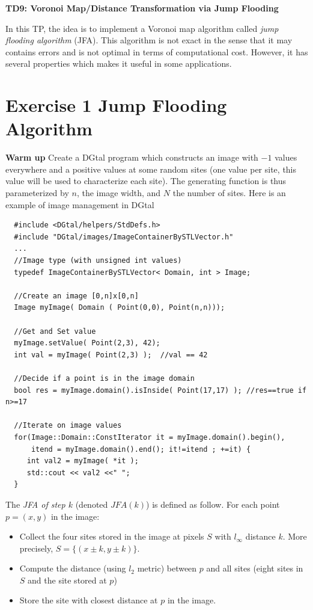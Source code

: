 \documentclass[a4paper, 11pt]{article}
\title{}
\author{}
\date{}
\begin{document}
\begin{center}
	\LARGE \textbf{TD9: Voronoi Map/Distance Transformation via Jump Flooding}
\end{center}

\bigskip
\par In this TP, the idea is to implement a Voronoi map algorithm called \emph{jump flooding algorithm} (JFA). This algorithm is not exact in the sense that it may contains errors and is not optimal in terms of computational cost. However, it has several properties which makes it useful in some applications.



\section*{Exercise 1 \rm Jump Flooding Algorithm}

{\bf Warm up} Create a DGtal program which constructs an image with $-1$  values everywhere and a positive  values at some random sites (one value per site, this value will be used to characterize each site). The generating function is thus parameterized by $n$, the image width, and $N$ the number of sites. Here is an example of image management in DGtal
\begin{verbatim}
  #include <DGtal/helpers/StdDefs.h>
  #include "DGtal/images/ImageContainerBySTLVector.h"
  ...
  //Image type (with unsigned int values)
  typedef ImageContainerBySTLVector< Domain, int > Image;

  //Create an image [0,n]x[0,n]
  Image myImage( Domain ( Point(0,0), Point(n,n)));

  //Get and Set value
  myImage.setValue( Point(2,3), 42);
  int val = myImage( Point(2,3) );  //val == 42

  //Decide if a point is in the image domain
  bool res = myImage.domain().isInside( Point(17,17) ); //res==true if n>=17

  //Iterate on image values
  for(Image::Domain::ConstIterator it = myImage.domain().begin(),
      itend = myImage.domain().end(); it!=itend ; +=it) {
     int val2 = myImage( *it );
     std::cout << val2 <<" ";
  }
\end{verbatim}


\par The \emph{JFA of step $k$} (denoted $JFA(k)$) is defined as follow. For each point $p=(x,y)$ in the image:
	\begin{itemize}
	\item Collect the four sites stored in the image at pixels $S$
          with  $l_\infty$  distance $k$. More precisely, $S=\{ (x \pm k,y\pm k)\}$.
	\item Compute the distance (using $l_2$ metric) between $p$ and all sites (eight sites in $S$ and the site stored at $p$)
	\item Store the site with closest distance at $p$ in the image.
	\end{itemize}
\end{document}

